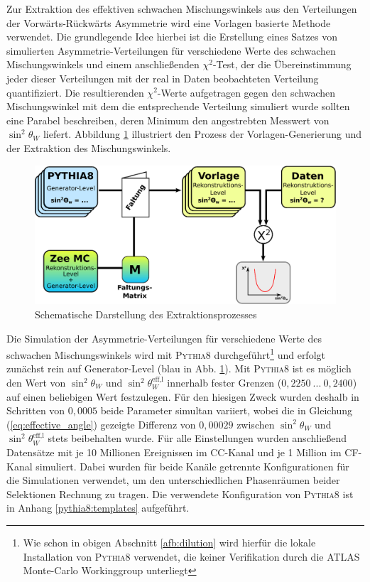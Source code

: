 Zur Extraktion des effektiven schwachen Mischungswinkels aus den Verteilungen
der Vorwärts-Rückwärts Asymmetrie wird eine Vorlagen basierte Methode
verwendet. Die grundlegende Idee hierbei ist die Erstellung eines Satzes von
simulierten Asymmetrie-Verteilungen für verschiedene Werte des schwachen
Mischungswinkels und einem anschließenden $\chi^2$-Test, der die Übereinstimmung
jeder dieser Verteilungen mit der real in Daten beobachteten Verteilung
quantifiziert. Die resultierenden $\chi^2$-Werte aufgetragen gegen den
schwachen Mischungswinkel mit dem die entsprechende Verteilung simuliert wurde
sollten eine Parabel beschreiben, deren Minimum den angestrebten Messwert von
$\sin^2\theta_W$ liefert. Abbildung \ref{fig:templates} illustriert den Prozess
der Vorlagen-Generierung und der Extraktion des Mischungswinkels.

\begin{figure}[h]
    \centering
    \includegraphics[width=1.0\textwidth]{img/templates}
    \caption[Schematische Darstellung des Extraktionsprozesses]
        {Schematische Darstellung des Extraktionsprozesses}
    \label{fig:templates}
\end{figure}

Die Simulation der Asymmetrie-Verteilungen für verschiedene Werte des schwachen
Mischungswinkels wird mit \textsc{Pythia8} durchgeführt\footnote{Wie schon in
obigen Abschnitt \ref{afb:dilution} wird hierfür die lokale Installation von
\textsc{Pythia8} verwendet, die keiner Verifikation durch die ATLAS Monte-Carlo
Workinggroup unterliegt} und erfolgt zunächst rein auf Generator-Level (blau in
Abb. \ref{fig:templates}). Mit \textsc{Pythia8} ist es möglich den Wert von
$\sin^2\theta_W$ und $\sin^2\theta_W^\text{eff,l}$ innerhalb fester Grenzen
($0,2250 \: ... \: 0,2400$) auf einen beliebigen Wert festzulegen. Für den
hiesigen Zweck wurden deshalb in Schritten von $0,0005$ beide Parameter
simultan variiert, wobei die in Gleichung (\ref{eq:effective_angle}) gezeigte
Differenz von $0,00029$ zwischen $\sin^2\theta_W$ und
$\sin^2\theta_W^\text{eff,l}$ stets beibehalten wurde. Für alle Einstellungen
wurden anschließend Datensätze mit je 10 Millionen Ereignissen im \ac{CC}-Kanal
und je 1 Million im \ac{CF}-Kanal simuliert. Dabei wurden für beide Kanäle
getrennte Konfigurationen für die Simulationen verwendet, um den
unterschiedlichen Phasenräumen beider Selektionen Rechnung zu tragen. Die
verwendete Konfiguration von \textsc{Pythia8} ist in Anhang
\ref{pythia8:templates} aufgeführt.

